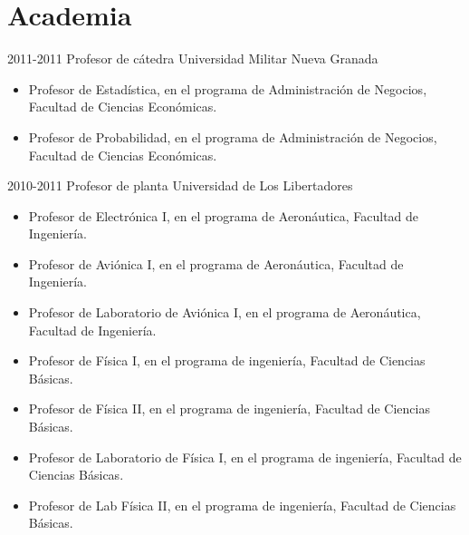 \section{Academia}

\begin{entrylist}
  \entry
	{2011-2011}
	{Profesor de cátedra}
	{Universidad Militar Nueva Granada}
	{\begin{itemize}
	    \item Profesor de Estadística, en el programa de Administración de Negocios, Facultad
		    de Ciencias Económicas.
            \item Profesor de Probabilidad, en el programa de Administración de Negocios, Facultad
		    de Ciencias Económicas.
	\end{itemize}}
  \entry
	{2010-2011}
	{Profesor de planta}
	{Universidad de Los Libertadores}
	{\begin{itemize}
              \item Profesor de Electrónica I, en el programa de Aeronáutica, Facultad de
		      Ingeniería.
              \item Profesor de Aviónica I, en el programa de Aeronáutica, Facultad de
		      Ingeniería.
              \item Profesor de Laboratorio de Aviónica I, en el programa de Aeronáutica, Facultad de
		      Ingeniería.
              \item Profesor de Física I, en el programa de ingeniería, Facultad de
		      Ciencias Básicas.
              \item Profesor de Física II, en el programa de ingeniería, Facultad de
		      Ciencias Básicas.
              \item Profesor de Laboratorio de Física I, en el programa de ingeniería, Facultad de
		      Ciencias Básicas.
              \item Profesor de Lab Física II, en el programa de ingeniería, Facultad de
		      Ciencias Básicas.
	\end{itemize}}

\end{entrylist}

